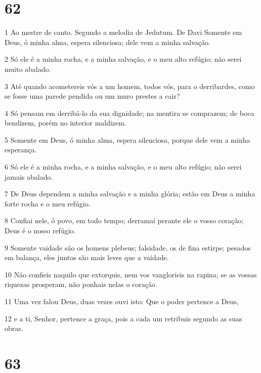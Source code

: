 \chapter{62}

\par 1 Ao mestre de canto. Segundo a melodia de Jedutum. De Davi Somente em Deus, ó minha alma, espera silenciosa; dele vem a minha salvação.
\par 2 Só ele é a minha rocha, e a minha salvação, e o meu alto refúgio; não serei muito abalado.
\par 3 Até quando acometereis vós a um homem, todos vós, para o derribardes, como se fosse uma parede pendida ou um muro prestes a cair?
\par 4 Só pensam em derribá-lo da sua dignidade; na mentira se comprazem; de boca bendizem, porém no interior maldizem.
\par 5 Somente em Deus, ó minha alma, espera silenciosa, porque dele vem a minha esperança.
\par 6 Só ele é a minha rocha, e a minha salvação, e o meu alto refúgio; não serei jamais abalado.
\par 7 De Deus dependem a minha salvação e a minha glória; estão em Deus a minha forte rocha e o meu refúgio.
\par 8 Confiai nele, ó povo, em todo tempo; derramai perante ele o vosso coração; Deus é o nosso refúgio.
\par 9 Somente vaidade são os homens plebeus; falsidade, os de fina estirpe; pesados em balança, eles juntos são mais leves que a vaidade.
\par 10 Não confieis naquilo que extorquis, nem vos vanglorieis na rapina; se as vossas riquezas prosperam, não ponhais nelas o coração.
\par 11 Uma vez falou Deus, duas vezes ouvi isto: Que o poder pertence a Deus,
\par 12 e a ti, Senhor, pertence a graça, pois a cada um retribuis segundo as suas obras.

\chapter{63}

